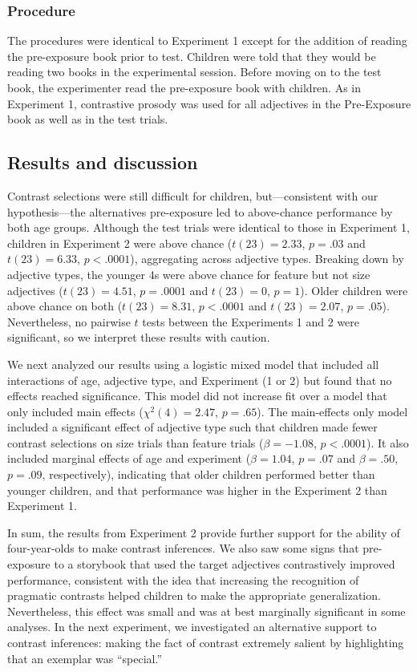 \documentclass[man]{apa2}
\begin{document}
\subsubsection{Procedure}

The procedures were identical to Experiment 1 except for the addition of reading the pre-exposure book prior to test. Children were told that they would be reading two books in the experimental session. Before moving on to the test book, the experimenter read the pre-exposure book with children. As in Experiment 1, contrastive prosody was used for all adjectives in the Pre-Exposure book as well as in the test trials.

\subsection{Results and discussion}

Contrast selections were still difficult for children, but---consistent with our hypothesis---the alternatives pre-exposure led to above-chance performance by both age groups. Although the test trials were identical to those in Experiment 1, children in Experiment 2 were above chance ($t(23) = 2.33$, $p = .03$ and $t(23) = 6.33$, $p < .0001$), aggregating across adjective types. Breaking down by adjective types, the younger 4s were above chance for feature but not size adjectives ($t(23) = 4.51$, $p = .0001$ and $t(23)=0$, $p = 1$). Older children were above chance on both ($t(23) = 8.31$, $p < .0001$ and $t(23)= 2.07$, $p = .05$). Nevertheless, no pairwise $t$ tests between the Experiments 1 and 2 were significant, so we interpret these results with caution. 

We next analyzed our results using a logistic mixed model that included all interactions of age, adjective type, and Experiment (1 or 2) but found that no effects reached significance. This model did not increase fit over a model that only included main effects ($\chi^2(4) = 2.47$, $p = .65$). The main-effects only model included a significant effect of adjective type such that children made fewer contrast selections on size trials than feature trials ($\beta = -1.08$, $p < .0001$). It also included marginal effects of age and experiment ($\beta = 1.04$, $p = .07$ and $\beta = .50$, $p = .09$, respectively), indicating that older children performed better than younger children, and that performance was higher in the Experiment 2 than Experiment 1. 

In sum, the results from Experiment 2 provide further support for the ability of four-year-olds to make contrast inferences. We also saw some signs that pre-exposure to a storybook that used the target adjectives contrastively improved performance, consistent with the idea that increasing the recognition of pragmatic contrasts helped children to make the appropriate generalization. Nevertheless, this effect was small and was at best marginally significant in some analyses. In the next experiment, we investigated an alternative support to contrast inferences: making the fact of contrast extremely salient by highlighting that an exemplar was ``special.''
\end{document}
